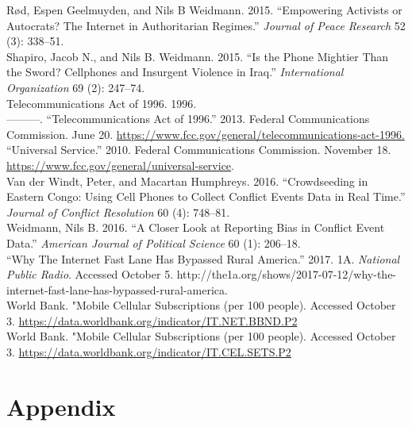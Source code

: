 \documentclass[12pt]{article}
\begin{document}
	\hspace*{-1cm}R\o d, Espen Geelmuyden, and Nils B Weidmann. 2015. “Empowering Activists or Autocrats? The Internet in Authoritarian Regimes.” \textit{Journal of Peace Research} 52 (3): 338--51. \\
	\hspace*{-1cm}Shapiro, Jacob N., and Nils B. Weidmann. 2015. “Is the Phone Mightier Than the Sword? Cellphones and Insurgent Violence in Iraq.” \textit{International Organization }69 (2): 247--74. \\
	Telecommunications Act of 1996. 1996.\\
	\hspace*{-1cm}———. “Telecommunications Act of 1996.” 2013. Federal Communications Commission. June 20. \url{https://www.fcc.gov/general/telecommunications-act-1996.}\\
	\hspace*{-1cm}“Universal Service.” 2010. Federal Communications Commission. November 18. \url{https://www.fcc.gov/general/universal-service}.\\
	\hspace*{-1cm}Van der Windt, Peter, and Macartan Humphreys. 2016. “Crowdseeding in Eastern Congo: Using Cell Phones to Collect Conflict Events Data in Real Time.” \textit{Journal of Conflict Resolution} 60 (4): 748--81.\\
	\hspace*{-1cm}Weidmann, Nils B. 2016. “A Closer Look at Reporting Bias in Conflict Event Data.” \textit{American Journal of Political Science }60 (1): 206--18. \\
	\hspace*{-1cm}“Why The Internet Fast Lane Has Bypassed Rural America.” 2017. 1A. \textit{National Public Radio}. Accessed October 5. http://the1a.org/shows/2017-07-12/why-the-internet-fast-lane-has-bypassed-rural-america.\\
	\hspace*{-1cm}World Bank. "Mobile Cellular Subscriptions (per 100 people). Accessed October 3. \url{https://data.worldbank.org/indicator/IT.NET.BBND.P2}\\
	\hspace*{-1cm}World Bank. "Mobile Cellular Subscriptions (per 100 people). Accessed October 3. \url{https://data.worldbank.org/indicator/IT.CEL.SETS.P2}
	
	
	\pagebreak
	
	\section{Appendix}
\end{document}
